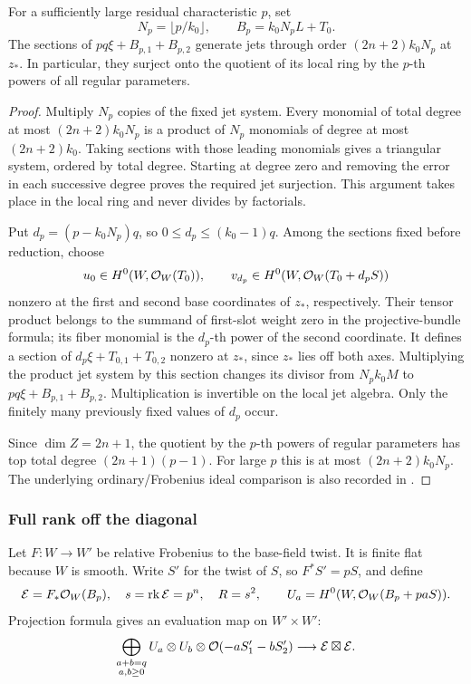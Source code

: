 \begin{lemma}\label{common:positive-characteristic-jets}
For a sufficiently large residual characteristic $p$, set
\[
 N_p=\lfloor p/k_0\rfloor,\qquad B_p=k_0N_pL+T_0.
\]
The sections of $pq\xi+B_{p,1}+B_{p,2}$ generate jets through order
$(2n+2)k_0N_p$ at $z_*$.  In particular, they surject onto the quotient
of its local ring by the $p$-th powers of all regular parameters.
\end{lemma}

\begin{proof}
Multiply $N_p$ copies of the fixed jet system.  Every monomial of
total degree at most $(2n+2)k_0N_p$ is a product of $N_p$ monomials
of degree at most $(2n+2)k_0$.  Taking sections with those leading
monomials gives a triangular system, ordered by total degree.
Starting at degree zero and removing the error in each successive
degree proves the required jet surjection. This argument takes
place in the local ring and never divides by factorials.

Put $d_p=(p-k_0N_p)q$, so $0\le d_p\le(k_0-1)q$.
Among the sections fixed before reduction, choose
\[
 u_0\in H^0(W,\mathcal{O}_W(T_0)),\qquad
 v_{d_p}\in H^0(W,\mathcal{O}_W(T_0+d_pS))
\]
nonzero at the first and second base coordinates of $z_*$,
respectively. Their tensor product belongs to the summand of
first-slot weight zero in the projective-bundle formula; its
fiber monomial is the $d_p$-th power of the second coordinate.
It defines a section of
$d_p\xi+T_{0,1}+T_{0,2}$ nonzero at $z_*$, since $z_*$ lies
off both axes. Multiplying the product jet system by this section
changes its divisor from $N_pk_0M$ to
$pq\xi+B_{p,1}+B_{p,2}$. Multiplication is invertible on the
local jet algebra. Only the finitely many previously fixed
values of $d_p$ occur.

Since $\dim Z=2n+1$, the
quotient by the $p$-th powers of regular parameters has top total
degree $(2n+1)(p-1)$.  For large $p$ this is at most
$(2n+2)k_0N_p$. The underlying ordinary/Frobenius ideal comparison is
also recorded in \cite[proof of Proposition~2.12, Equation~(2.8)]{MustataSchwede2014}.
\end{proof}

\subsubsection{Full rank off the diagonal}

Let $F:W\to W'$ be relative Frobenius to the base-field twist.
It is finite flat because $W$ is smooth.  Write $S'$ for the twist
of $S$, so $F^*S'=pS$, and define
\[
 \mathcal E=F_*\mathcal{O}_W(B_p),\quad s=\operatorname{rk}\mathcal E=p^n,\quad R=s^2,
 \qquad U_a=H^0(W,\mathcal{O}_W(B_p+paS)).
\]
Projection formula gives an evaluation map on $W'\times W'$:
\begin{equation}\label{common:two-slot-evaluation}
 \bigoplus_{\substack{a+b=q\\a,b\ge0}}
 U_a\otimes U_b\otimes
 \mathcal{O}(-aS'_1-bS'_2)
 \longrightarrow \mathcal E\boxtimes\mathcal E.
\end{equation}

